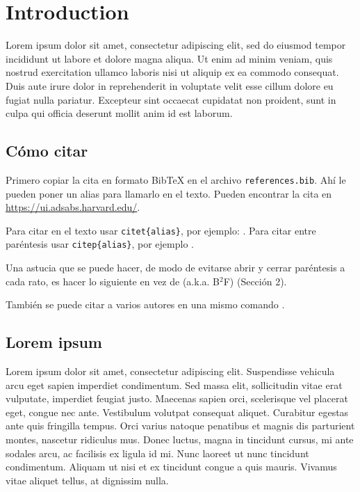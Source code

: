 \chapter{Introduction}
\label{chap:introduction}


Lorem ipsum dolor sit amet, consectetur adipiscing elit, sed do eiusmod tempor incididunt ut labore et dolore magna aliqua. Ut enim ad minim veniam, quis nostrud exercitation ullamco laboris nisi ut aliquip ex ea commodo consequat. Duis aute irure dolor in reprehenderit in voluptate velit esse cillum dolore eu fugiat nulla pariatur. Excepteur sint occaecat cupidatat non proident, sunt in culpa qui officia deserunt mollit anim id est laborum.

\section{Cómo citar}
Primero copiar la cita en formato BibTeX en el archivo \texttt{references.bib}. Ahí le pueden poner un alias para llamarlo en el texto. Pueden encontrar la cita en \url{https://ui.adsabs.harvard.edu/}.

Para citar en el texto usar \texttt{citet\{alias\}}, por ejemplo: \citet{B2FH}. Para citar entre paréntesis usar \texttt{citep\{alias\}}, por ejemplo \citep{B2FH}.

Una astucia que se puede hacer, de modo de evitarse abrir y cerrar paréntesis a cada rato, es hacer lo siguiente \citep[a.k.a. B$^2$F;][Sección 2]{B2FH} en vez de (a.k.a. B$^2$F) \citep{B2FH} (Sección 2).

También se puede citar a varios autores en una mismo comando \citep{Tregloan2020, B2FH}.



\section{Lorem ipsum}

Lorem ipsum dolor sit amet, consectetur adipiscing elit. Suspendisse vehicula arcu eget sapien imperdiet condimentum. Sed massa elit, sollicitudin vitae erat vulputate, imperdiet feugiat justo. Maecenas sapien orci, scelerisque vel placerat eget, congue nec ante. Vestibulum volutpat consequat aliquet. Curabitur egestas ante quis fringilla tempus. Orci varius natoque penatibus et magnis dis parturient montes, nascetur ridiculus mus. Donec luctus, magna in tincidunt cursus, mi ante sodales arcu, ac facilisis ex ligula id mi. Nunc laoreet ut nunc tincidunt condimentum. Aliquam ut nisi et ex tincidunt congue a quis mauris. Vivamus vitae aliquet tellus, at dignissim nulla.

